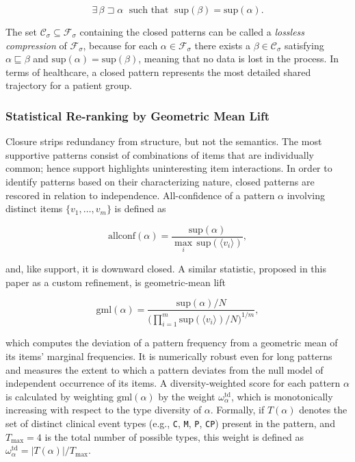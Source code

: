 \begin{equation}
    \exists\, \beta \sqsupset \alpha \;\text{ such that }\; \mathrm{sup}(\beta) = \mathrm{sup}(\alpha).
    \label{eq:closed}
\end{equation}

The set $\mathcal{C}_\sigma \subseteq \mathcal{F}_\sigma$ containing the closed patterns can be called a \emph{lossless compression} of $\mathcal{F}_\sigma$, because for each $\alpha \in \mathcal{F}_\sigma$ there exists a $\beta \in \mathcal{C}_\sigma$ satisfying $\alpha \sqsubseteq \beta$ and $\mathrm{sup}(\alpha) = \mathrm{sup}(\beta)$, meaning that no data is lost in the process. In terms of healthcare, a closed pattern represents the most detailed shared trajectory for a patient group.

\subsubsection*{Statistical Re-ranking by Geometric Mean Lift}

Closure strips redundancy from structure, but not the semantics. The most supportive patterns consist of combinations of items that are individually common; hence support highlights uninteresting item interactions. In order to identify patterns based on their characterizing nature, closed patterns are rescored in relation to independence. All-confidence of a pattern $\alpha$ involving distinct items $\{v_1, \ldots, v_m\}$ \cite{omiecinski2003} is defined as

\begin{equation}
    \mathrm{allconf}(\alpha) = \frac{\mathrm{sup}(\alpha)}{\max_{i}\, \mathrm{sup}(\langle v_i \rangle)},
    \label{eq:allconf}
\end{equation}

and, like support, it is downward closed. A similar statistic, proposed in this paper\cite{omiecinski2003} as a custom refinement, is geometric-mean lift

\begin{equation}
    \mathrm{gml}(\alpha) = \frac{\mathrm{sup}(\alpha)/N}{\bigl(\prod_{i=1}^{m} \mathrm{sup}(\langle v_i \rangle)/N\bigr)^{1/m}},
    \label{eq:gml}
\end{equation}

which computes the deviation of a pattern frequency from a geometric mean of its items' marginal frequencies. It is numerically robust even for long patterns and measures the extent to which a pattern deviates from the null model of independent occurrence of its items. A diversity-weighted score for each pattern $\alpha$ is calculated by weighting $\mathrm{gml}(\alpha)$ by the weight $\omega_\alpha^{\mathrm{td}}$, which is monotonically increasing with respect to the type diversity of $\alpha$. Formally, if $T(\alpha)$ denotes the set of distinct clinical event types (e.g., \texttt{C}, \texttt{M}, \texttt{P}, \texttt{CP}) present in the pattern, and $T_{\max} = 4$ is the total number of possible types, this weight is defined as $\omega_\alpha^{\mathrm{td}} = |T(\alpha)| / T_{\max}$.

